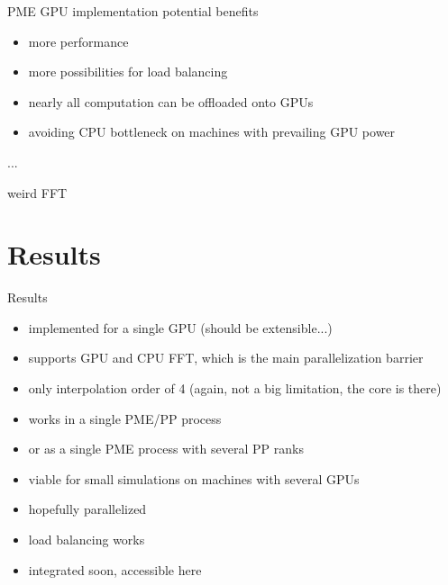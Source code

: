 \documentclass[11pt]{beamer}
\begin{document}
\begin{frame}{PME GPU implementation potential benefits}
\begin{itemize}
\item more performance
\item more possibilities for load balancing
\item nearly all computation can be offloaded onto GPUs
\item avoiding CPU bottleneck on machines with prevailing GPU power  
\end{itemize}
\end{frame}

\begin{frame}{...}
\end{frame}

\begin{frame}{weird FFT}
\end{frame}

\section{Results}
\begin{frame}{Results}
\begin{itemize}
\item implemented for a single GPU (should be extensible...)
\item supports GPU and CPU FFT, which is the main parallelization barrier 
\item only interpolation order of 4 (again, not a big limitation, the core is there)
\item works in a single PME/PP process
\item or as a single PME process with several PP ranks
\item viable for small simulations on machines with several GPUs
\item hopefully parallelized
\item load balancing works
\item integrated soon, accessible here
\end{itemize}
\end{frame}
\end{document}

